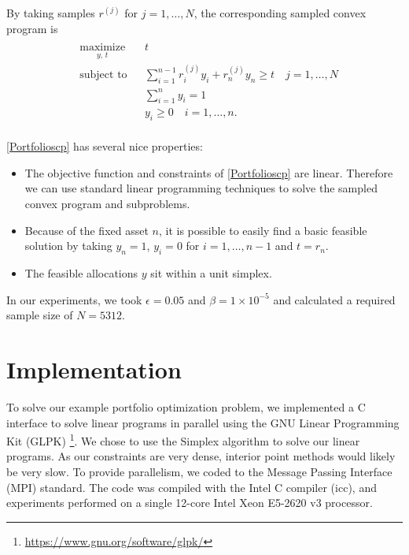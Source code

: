 \documentclass[12pt]{article}
\begin{document}
By taking samples $r^{(j)}$ for $j = 1, \ldots, N$, the corresponding sampled convex program is 
\begin{align}\label{Portfolioscp}
\begin{split}
\begin{aligned}
    & \underset{y, \,t}{\text{maximize}}
    & & t \\
    & \text{subject to}
    & & \sum_{i=1}^{n-1} r_i^{(j)} y_i + r_n^{(j)} y_n \geq t \quad j = 1, \ldots, N \\
    & & & \sum_{i=1}^n y_i = 1 \\
    & & & y_i \geq 0 \quad i = 1, \ldots, n.
\end{aligned}
\end{split} \tag{Portfolio SCP$_N$}
\end{align}


\ref{Portfolioscp} has several nice properties:
\begin{itemize}
\item The objective function and constraints of \ref{Portfolioscp} are linear. Therefore we can use standard linear programming techniques to solve the sampled convex program and subproblems.
\item Because of the fixed asset $n$, it is possible to easily find a basic feasible solution by taking $y_n = 1$, $y_i = 0$ for $i = 1, \ldots, n-1$ and $t = r_n$.
\item The feasible allocations $y$ sit within a unit simplex.
\end{itemize}

In our experiments, we took $\epsilon = 0.05$ and $\beta = 1 \times 10^{-5}$ and calculated a required sample size of $N = 5312$.

\section*{Implementation}

To solve our example portfolio optimization problem, we implemented a C interface to solve linear programs in parallel using the GNU Linear Programming Kit (GLPK) \footnote{\url{https://www.gnu.org/software/glpk/}}.
We chose to use the Simplex algorithm to solve our linear programs.  
As our constraints are very dense, interior point methods would likely be very slow.
To provide parallelism, we coded to the Message Passing Interface (MPI) standard.
The code was compiled with the Intel C compiler (icc), and experiments performed on a single 12-core Intel Xeon E5-2620 v3 processor.
\end{document}
